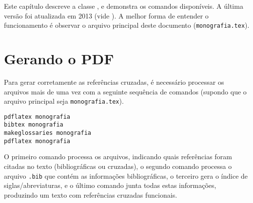 \newcommand{\texCommand}[1]{\texttt{\textbackslash{#1}}}%

\newcommand{\exemplo}[1]{%
	\vspace{\baselineskip}%
	\noindent\fbox{\begin{minipage}{\textwidth}#1\end{minipage}}%
	\\\vspace{\baselineskip}}%

\newcommand{\exemploVerbatim}[1]{%
	\vspace{\baselineskip}%
	\noindent\fbox{\begin{minipage}{\textwidth}%
			#1\end{minipage}}%
	\\\vspace{\baselineskip}}%


Este capítulo descreve a classe \unbene, e demonstra os comandos disponíveis. A última versão foi
atualizada em 2013 (vide ). A melhor forma de entender o funcionamento é observar
o arquivo principal deste documento (\texttt{monografia.tex}).

\section{Gerando o PDF}

Para gerar corretamente as referências cruzadas, é necessário processar os arquivos mais de uma vez
com a seguinte sequência de comandos (supondo que o arquivo principal seja \texttt{monografia.tex}).

\begin{verbatim}
pdflatex monografia
bibtex monografia
makeglossaries monografia
pdflatex monografia
\end{verbatim}

O primeiro comando processa os arquivos, indicando quais referências foram citadas no texto 
(bibliográficas ou cruzadas), o segundo comando processa o arquivo \texttt{.bib} que contém as 
informações bibliográficas, o terceiro gera o índice de siglas/abreviaturas, e o último comando 
junta todas estas informações, produzindo um texto com referências cruzadas funcionais.


